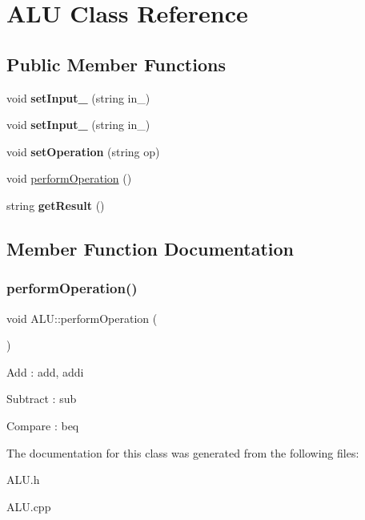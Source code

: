 \hypertarget{class_a_l_u}{}\section{A\+LU Class Reference}
\label{class_a_l_u}
\subsection*{Public Member Functions}
\begin{DoxyCompactItemize}
\item 
\mbox{\label{class_a_l_u_ad8a6bcd0475203096a993bf3bee9361e}} 
void {\bfseries set\+Input\+\_} (string in\+\_)
\item 
\mbox{\label{class_a_l_u_a39557cb057f0b84a659a25d1de9fb028}} 
void {\bfseries set\+Input\+\_} (string in\+\_)
\item 
\mbox{\label{class_a_l_u_afc8f247086ae4989ed4577e070a6175d}} 
void {\bfseries set\+Operation} (string op)
\item 
void \mbox{\hyperlink{class_a_l_u_a40f99b20256737e10973d6bf0e11a20c}{perform\+Operation}} ()
\item 
\mbox{\label{class_a_l_u_ab12f22ca27e4f465a509be24e464d7fc}} 
string {\bfseries get\+Result} ()
\end{DoxyCompactItemize}


\subsection{Member Function Documentation}
\mbox{\label{class_a_l_u_a40f99b20256737e10973d6bf0e11a20c}} 
\subsubsection{\texorpdfstring{perform\+Operation()}{performOperation()}}
{\footnotesize\ttfamily void A\+L\+U\+::perform\+Operation (\begin{DoxyParamCaption}{ }\end{DoxyParamCaption})}

Add \+: add, addi

Subtract \+: sub

Compare \+: beq 

The documentation for this class was generated from the following files\+:\begin{DoxyCompactItemize}
\item 
A\+L\+U.\+h\item 
A\+L\+U.\+cpp\end{DoxyCompactItemize}
